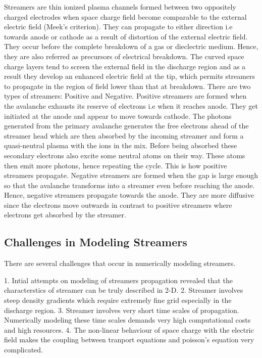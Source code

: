 Streamers are thin ionized plasma channels formed between two oppositely charged electrodes when space charge field become comparable to the external electric field (Meek's criterion). They can propagate to either direction i.e towards anode or cathode as a result of distortion of the external electric field. They occur before the complete breakdown of a gas or dieclectric medium. Hence, they are also referred as precursors of electrical breakdown.  The curved space charge layers tend to screen the external field in the discharge region and as a result they develop an enhanced electric field at the tip, which permits streamers to propagate in the region of field lower than that at breakdown. 
There are two types of streamers: Positive and Negative. Positive streamers are formed when the avalanche exhausts its reserve of electrons i.e when it reaches anode. They get initiated at the anode and appear to move towards cathode. The photons generated from the primary avalanche generates the free electrons ahead of the streamer head which are then absorbed by the incoming streamer and form a quasi-neutral plasma with the ions in the mix. Before being absorbed these secondary electrons also excite some neutral atoms on their way. These atoms then emit more photons, hence repeating the cycle. This is how positive streamers propagate. Negative streamers are formed when the gap is large enough so that the avalanche transforms into a streamer even before reaching the anode. Hence, negative streamers propagate towards the anode. They are more diffusive since the electrons move outwards in contrast to positive streamers where electrons get absorbed by the streamer.    

\subsection{Challenges in Modeling Streamers}

   There are several challenges that occur in numerically modeling streamers. 
   
   1. Intial attempts on modeling of streamers propagation revealed that the characterstics of streamer can be truly described in 2-D. 
   2. Streamer involves steep density gradients which require extremely fine grid especially in the discharge region.
   3. Streamer involves very short time scales of propagation. Numerically modeling these time scales demands very high computational costs and high resources. 
   4. The non-linear behaviour of space charge with the electric field makes the coupling between tranport equations and poisson's equation very complicated.


